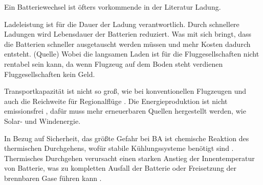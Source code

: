 Ein Batteriewechsel ist öfters vorkommende in der Literatur Ladung.

Ladeleistung ist für die Dauer der Ladung verantwortlich. Durch schnellere Ladungen wird Lebensdauer der Batterien reduziert. Was mit sich bringt, dass die Batterien schneller ausgetauscht werden müssen
und mehr Kosten dadurch entsteht. (Quelle) Wobei die langsamen Laden ist für die Fluggesellschaften nicht rentabel sein kann, 
da wenn Flugzeug auf dem Boden steht verdienen Fluggesellschaften kein Geld.

Transportkapazität ist nicht so groß, wie bei konventionellen Flugzeugen und auch die Reichweite für Regionalflüge \cite{abrantes2024impact}.
Die Energieproduktion ist nicht emissionsfrei \cite{abrantes2024impact}, dafür muss mehr erneuerbaren Quellen hergestellt werden, 
wie Solar- und Windenergie. 

In Bezug auf Sicherheit, das größte Gefahr bei BA ist chemische Reaktion des thermischen Durchgehens, wofür stabile
Kühlungssysteme benötigt sind \cite{donckers2024electric}. Thermisches Durchgehen verursacht einen starken Anstieg der 
Innentemperatur von Batterie, was zu kompletten Ausfall der Batterie oder Freisetzung der brennbaren Gase führen kann \cite{shahid2022review}.
